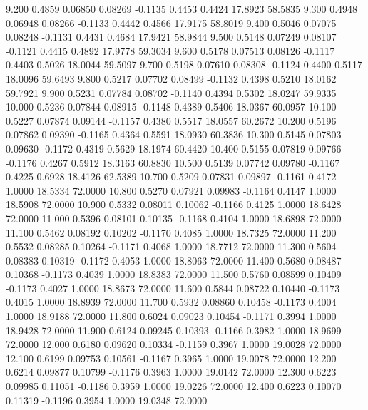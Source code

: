   9.200   0.4859   0.06850   0.08269  -0.1135   0.4453   0.4424  17.8923  58.5835
   9.300   0.4948   0.06948   0.08266  -0.1133   0.4442   0.4566  17.9175  58.8019
   9.400   0.5046   0.07075   0.08248  -0.1131   0.4431   0.4684  17.9421  58.9844
   9.500   0.5148   0.07249   0.08107  -0.1121   0.4415   0.4892  17.9778  59.3034
   9.600   0.5178   0.07513   0.08126  -0.1117   0.4403   0.5026  18.0044  59.5097
   9.700   0.5198   0.07610   0.08308  -0.1124   0.4400   0.5117  18.0096  59.6493
   9.800   0.5217   0.07702   0.08499  -0.1132   0.4398   0.5210  18.0162  59.7921
   9.900   0.5231   0.07784   0.08702  -0.1140   0.4394   0.5302  18.0247  59.9335
  10.000   0.5236   0.07844   0.08915  -0.1148   0.4389   0.5406  18.0367  60.0957
  10.100   0.5227   0.07874   0.09144  -0.1157   0.4380   0.5517  18.0557  60.2672
  10.200   0.5196   0.07862   0.09390  -0.1165   0.4364   0.5591  18.0930  60.3836
  10.300   0.5145   0.07803   0.09630  -0.1172   0.4319   0.5629  18.1974  60.4420
  10.400   0.5155   0.07819   0.09766  -0.1176   0.4267   0.5912  18.3163  60.8830
  10.500   0.5139   0.07742   0.09780  -0.1167   0.4225   0.6928  18.4126  62.5389
  10.700   0.5209   0.07831   0.09897  -0.1161   0.4172   1.0000  18.5334  72.0000
  10.800   0.5270   0.07921   0.09983  -0.1164   0.4147   1.0000  18.5908  72.0000
  10.900   0.5332   0.08011   0.10062  -0.1166   0.4125   1.0000  18.6428  72.0000
  11.000   0.5396   0.08101   0.10135  -0.1168   0.4104   1.0000  18.6898  72.0000
  11.100   0.5462   0.08192   0.10202  -0.1170   0.4085   1.0000  18.7325  72.0000
  11.200   0.5532   0.08285   0.10264  -0.1171   0.4068   1.0000  18.7712  72.0000
  11.300   0.5604   0.08383   0.10319  -0.1172   0.4053   1.0000  18.8063  72.0000
  11.400   0.5680   0.08487   0.10368  -0.1173   0.4039   1.0000  18.8383  72.0000
  11.500   0.5760   0.08599   0.10409  -0.1173   0.4027   1.0000  18.8673  72.0000
  11.600   0.5844   0.08722   0.10440  -0.1173   0.4015   1.0000  18.8939  72.0000
  11.700   0.5932   0.08860   0.10458  -0.1173   0.4004   1.0000  18.9188  72.0000
  11.800   0.6024   0.09023   0.10454  -0.1171   0.3994   1.0000  18.9428  72.0000
  11.900   0.6124   0.09245   0.10393  -0.1166   0.3982   1.0000  18.9699  72.0000
  12.000   0.6180   0.09620   0.10334  -0.1159   0.3967   1.0000  19.0028  72.0000
  12.100   0.6199   0.09753   0.10561  -0.1167   0.3965   1.0000  19.0078  72.0000
  12.200   0.6214   0.09877   0.10799  -0.1176   0.3963   1.0000  19.0142  72.0000
  12.300   0.6223   0.09985   0.11051  -0.1186   0.3959   1.0000  19.0226  72.0000
  12.400   0.6223   0.10070   0.11319  -0.1196   0.3954   1.0000  19.0348  72.0000
